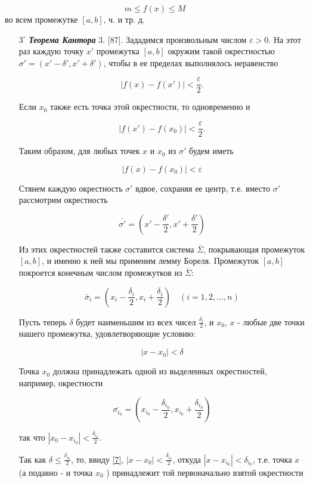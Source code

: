 \documentclass[10pt, twoside]{article}
\begin{document}
$$
  m \leqslant f(x) \leqslant M
$$
во всем промежутке $[a, b]$, ч. и тр. д.

\begin{enumerate}
\item[$3^{\circ}$] \textbf{\textit{Теорема Кантора}}
3.  [87]. Зададимся произвольным числом $\varepsilon>0$. На этот раз каждую точку $x'$ промежутка $[a, b]$ окружим такой окрестностью $\sigma'=\left(x'-\delta', x'+\delta'\right)$, чтобы в ее пределах выполнялось неравенство

$$
  \left|f(x)-f\left(x'\right)\right|<\frac{\varepsilon}{2}.
$$

Если $x_{0}$ также есть точка этой окрестности, то одновременно и

$$
  \left|f\left(x'\right)-f\left(x_{0}\right)\right|<\frac{\varepsilon}{2}.
$$

Таким образом, для любых точек $x$ и $x_{0}$ из $\sigma'$ будем иметь

$$
  \left|f(x)-f\left(x_{0}\right)\right|<\varepsilon
$$

Стянем каждую окрестность $\sigma'$ вдвое, сохраняя ее центр, т.е. вместо $\sigma'$ рассмотрим окрестность

$$
  \overline{\sigma'}=\left(x'-\frac{\delta'}{2}, x'+\frac{\delta'}{2}\right)
$$

Из этих окрестностей также составится система $\overline{\Sigma}$, покрывающая промежуток $[a, b]$, и именно к ней мы применим лемму Бореля. Промежуток $[a, b]$ покроется конечным числом промежутков из $\overline{\Sigma}$:

$$
  \bar{\sigma}_{i}=\left(x_{i}-\frac{\delta_{i}}{2}, x_{i}+\frac{\delta_{i}}{2}\right) \quad(i=1,2, \ldots, n)
$$

Пусть теперь $\delta$ будет наименьшим из всех чисел $\frac{\delta_{i}}{2}$, и $x_{0}$, $x$ - любые две точки нашего промежутка, удовлетворяющие условию:


\begin{equation*}
  \left|x-x_{0}\right|<\delta \tag{7}\label{7}
\end{equation*}


Точка $x_{0}$ должна принадлежать одной из выделенных окрестностей, например, окрестности

$$
  \overline{\sigma_{i_{0}}}=\left(x_{i_{0}}-\frac{\delta_{i_{0}}}{2}, x_{i_{0}} + \frac{\delta_{i_{0}}}{2}\right)
$$

так что $\left|x_{0}-x_{i_{0}}\right|<\frac{\delta_{i_{0}}}{2}$.

Так как $\delta \leqslant \frac{\delta_{i_{0}}}{2}$, то, ввиду \eqref{7}, $\left|x-x_{0}\right|<\frac{\delta_{i_{0}}}{2}$, откуда $\left|x-x_{i_{0}}\right|<\delta_{i_{0}}$, т.е. точка $x$ (а подавно - и точка $x_{0}$ ) принадлежит той первоначально взятой окрестности


\end{enumerate}
\end{document}
